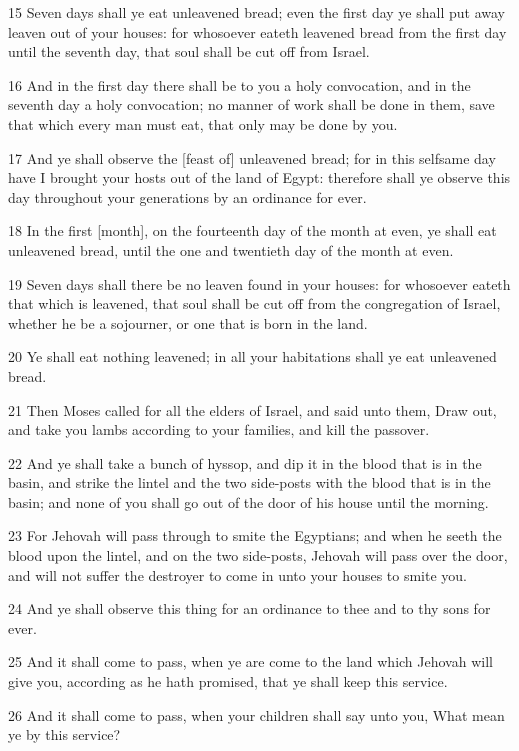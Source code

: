 \par 15 Seven days shall ye eat unleavened bread; even the first day ye shall put away leaven out of your houses: for whosoever eateth leavened bread from the first day until the seventh day, that soul shall be cut off from Israel.
\par 16 And in the first day there shall be to you a holy convocation, and in the seventh day a holy convocation; no manner of work shall be done in them, save that which every man must eat, that only may be done by you.
\par 17 And ye shall observe the [feast of] unleavened bread; for in this selfsame day have I brought your hosts out of the land of Egypt: therefore shall ye observe this day throughout your generations by an ordinance for ever.
\par 18 In the first [month], on the fourteenth day of the month at even, ye shall eat unleavened bread, until the one and twentieth day of the month at even.
\par 19 Seven days shall there be no leaven found in your houses: for whosoever eateth that which is leavened, that soul shall be cut off from the congregation of Israel, whether he be a sojourner, or one that is born in the land.
\par 20 Ye shall eat nothing leavened; in all your habitations shall ye eat unleavened bread.
\par 21 Then Moses called for all the elders of Israel, and said unto them, Draw out, and take you lambs according to your families, and kill the passover.
\par 22 And ye shall take a bunch of hyssop, and dip it in the blood that is in the basin, and strike the lintel and the two side-posts with the blood that is in the basin; and none of you shall go out of the door of his house until the morning.
\par 23 For Jehovah will pass through to smite the Egyptians; and when he seeth the blood upon the lintel, and on the two side-posts, Jehovah will pass over the door, and will not suffer the destroyer to come in unto your houses to smite you.
\par 24 And ye shall observe this thing for an ordinance to thee and to thy sons for ever.
\par 25 And it shall come to pass, when ye are come to the land which Jehovah will give you, according as he hath promised, that ye shall keep this service.
\par 26 And it shall come to pass, when your children shall say unto you, What mean ye by this service?
